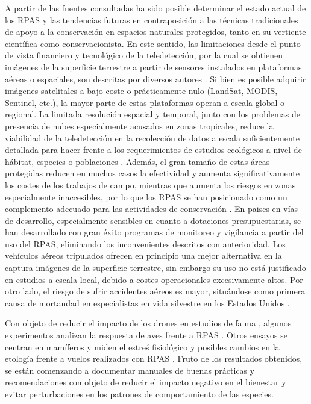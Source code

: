 \documentclass[9t,twocolumn]{article}
\begin{document}
A partir de las fuentes consultadas ha sido posible determinar el estado
actual de los RPAS y las tendencias futuras en contraposición a las
técnicas tradicionales de apoyo a la conservación en espacios naturales
protegidos, tanto en su vertiente científica como conservacionista. En
este sentido, las limitaciones desde el punto de vista financiero y
tecnológico de la teledetección, por la cual se obtienen imágenes de la
superficie terrestre a partir de sensores instalados en plataformas
aéreas o espaciales, son descritas por diversos autores \citep{Koh2012}.
Si bien es posible adquirir imágenes satelitales a bajo coste o
prácticamente nulo (LandSat, MODIS, Sentinel, etc.), la mayor parte de
estas plataformas operan a escala global o regional. La limitada
resolución espacial y temporal, junto con los problemas de presencia de
nubes especialmente acusados en zonas tropicales, reduce la viabilidad
de la teledetección en la recolección de datos a escala suficientemente
detallada para hacer frente a los requerimientos de estudios ecológicos
a nivel de hábitat, especies o poblaciones \citep{Wulder2004}. Además,
el gran tamaño de estas áreas protegidas reducen en muchos casos la
efectividad y aumenta significativamente los costes de los trabajos de
campo, mientras que aumenta los riesgos en zonas especialmente
inaccesibles, por lo que los RPAS se han posicionado como un complemento
adecuado para las actividades de conservación \citep{Zahawi2015}. En
paises en vías de desarrollo, especialmente sensibles en cuanto a
dotaciones presupuestarias, se han desarrollado con gran éxito programas
de monitoreo y vigilancia a partir del uso del RPAS, eliminando los
inconvenientes descritos con anterioridad. Los vehículos aéreos
tripulados ofrecen en principio una mejor alternativa en la captura
imágenes de la superficie terrestre, sin embargo su uso no está
justificado en estudios a escala local, debido a costes operacionales
excesivamente altos. Por otro lado, el riesgo de sufrir accidentes
aéreos es mayor, situándose como primera causa de mortandad en
especialistas en vida silvestre en los Estados Unidos \citep{Sasse2003}.

Con objeto de reducir el impacto de los drones en estudios de fauna ,
algunos experimentos analizan la respuesta de aves frente a RPAS
\citep{Vas2015}. Otros ensayos se centran en mamíferos y miden el estreś
fisiológico y posibles cambios en la etología frente a vuelos realizados
con RPAS \citep{Ditmer2015}. Fruto de los resultados obtenidos, se están
comenzando a documentar manuales de buenas prácticas y recomendaciones
con objeto de reducir el impacto negativo en el bienestar y evitar
perturbaciones en los patrones de comportamiento de las especies.
\end{document}
